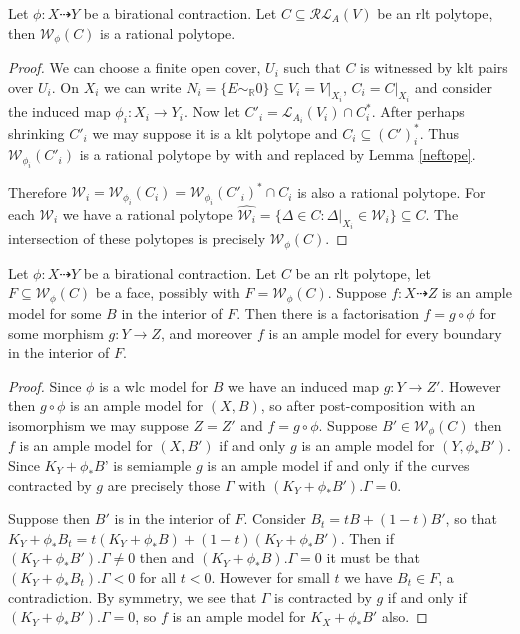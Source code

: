 \documentclass[a4paper,12pt]{amsart}
\begin{document}
	\begin{lemma}\label{rationality}
		Let $\phi: X \dashrightarrow Y$ be a birational contraction. Let $C \subseteq \mathcal{RL}_{A}(V)$ be an rlt polytope, then $\mathcal{W}_{\phi}(C)$ is a rational polytope.
	\end{lemma}
	\begin{proof}
		We can choose a finite open cover, $U_{i}$ such that $C$ is witnessed by klt pairs over $U_{i}$. On $X_{i}$ we can write $N_{i}=\{E\sim_{\mathbb{R}} 0\} \subseteq V_{i}=V|_{X_{i}}$, $C_{i}=C|_{X_{i}}$ and consider the induced map $\phi_{i}:X_{i} \to Y_{i}$. Now let $C'_{i}=\mathcal{L}_{A_{i}}(V_{i}) \cap C_{i}^{*}$. After perhaps shrinking $C'_{i}$ we may suppose it is a klt polytope and $C_{i} \subseteq (C')^{*}_{i}$. Thus $\mathcal{W}_{\phi_{i}}(C'_{i})$ is a rational polytope by \cite[Corollary 3.11.2]{birkar2010existence} with \cite[Theorem 3.11.1]{birkar2010existence} and \cite[Lemma 3.7.4]{birkar2010existence} replaced by Lemma \ref{neftope}.
		
		Therefore $\mathcal{W}_{i}=\mathcal{W}_{\phi_{i}}(C_{i})=\mathcal{W}_{\phi_{i}}(C'_{i})^{*}\cap C_{i}$ is also a rational polytope. For each $\mathcal{W}_{i}$ we have a rational polytope $\hat{\mathcal{W}_{i}}=\{\Delta \in C: \Delta|_{X_{i}} \in \mathcal{W}_{i}\} \subseteq C$. The intersection of these polytopes is precisely $\mathcal{W}_{\phi}(C)$.
	\end{proof}
	
	\begin{lemma}\label{faces}
		Let $\phi: X \dashrightarrow Y$ be a birational contraction. Let $C$ be an rlt polytope, let $F \subseteq \mathcal{W}_{\phi}(C)$ be a face, possibly with $F =\mathcal{W}_{\phi}(C)$. Suppose $f: X \dashrightarrow Z$ is an ample model for some $B$ in the interior of $F$. Then there is a factorisation $f=g \circ \phi$ for some morphism $g:Y \to Z$, and moreover $f$ is an ample model for every boundary in the interior of $F$.
	\end{lemma}
	
	\begin{proof}
		
		Since $\phi$ is a wlc model for $B$ we have an induced map $g: Y \to Z'$. However then $g\circ \phi$ is an ample model for $(X,B)$, so after post-composition with an isomorphism we may suppose $Z=Z'$ and $f=g\circ \phi$. Suppose $B' \in \mathcal{W}_{\phi}(C)$ then $f$ is an ample model for $(X,B')$ if and only $g$ is an ample model for $(Y,\phi_{*}B')$. Since $K_{Y}+\phi_{*}B$' is semiample $g$ is an ample model if and only if the curves contracted by $g$ are precisely those $\Gamma$ with $(K_{Y}+\phi_{*}B').\Gamma=0$.
		
		Suppose then $B'$ is in the interior of $F$. Consider $B_{t}=tB+(1-t)B'$, so that $K_{Y}+\phi_{*}B_{t}= t(K_{Y}+\phi_{*}B)+(1-t)(K_{Y}+\phi_{*}B')$. Then if $(K_{Y}+\phi_{*}B').\Gamma \neq 0$ then and $(K_{Y}+\phi_{*}B).\Gamma=0$ it must be that $(K_{Y}+\phi_{*}B_{t}).\Gamma < 0$ for all $t < 0$. However for small $t$ we have $B_{t} \in F$, a contradiction. By symmetry, we see that $\Gamma$ is contracted by $g$ if and only if $(K_{Y}+\phi_{*}B').\Gamma=0$, so $f$ is an ample model for $K_{X}+\phi_{*}B'$ also.
	\end{proof} 
\end{document}

